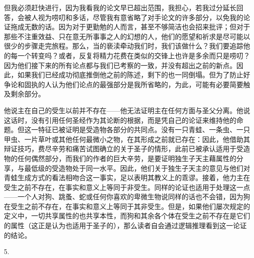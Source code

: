 但我必须赶快进行，因为我看我的论文早已超出范围，我担心，若我过分延长回答，会被人视为唠叨和多话，尽管我有意省略了对手论文的许多部分，以免我的论证拖成无数的话。因为对于更勤勉的人而言，甚至不够简洁也会招来批评；但对于那些不注重效益、只在意无所事事之人的幻想的人，他们的愿望和祈求是尽可能以很少的步骤走完旅程。那么，当的亵渎牵动我们时，我们该做什么？我们要追踪他的每一个转变吗？或者，反复将精力花费在类似的交锋上也许是多余而只是唠叨？因为他们接下来的所有论点都与我们已考察的一致，并没有超出之前的新点。因此，如果我们已经成功彻底推倒他之前的陈述，剩下的也一同倒塌。但为了防止好争论和固执的人认为他们论点的最强部分是我所省略的，为此，可能有必要简要触及剩余部分。\par

他说主在自己的受生以前并不存在——他无法证明主在任何方面与圣父分离。他说这话时，没有引用任何圣经作为其论断的根据，而是凭自己的论证来维持他的命题。但这一特征已被证明是受造物各部分的共同点。没有一只青蛙、一条虫、一只甲虫、一片草叶或其他任何最微小之物，在其形成之前就已存在：因此，他借助其辩证技巧，费尽辛劳和痛苦试图确立的关于圣子的情形，此前已被承认适用于受造物的任何偶然部分，而我们的作者的巨大辛劳，是要证明独生子天主藉属性的分享，与最低级的受造物处于同一水平。因此，他们关于独生子天主的意见与他们对青蛙生成方式的看法相吻合这一事实，足以表明其教义上的乖谬。接着，他力主在受生之前不存在，在事实和意义上等同于非受生。同样的论证也适用于处理这一点——一个人对狗、跳蚤、蛇或任何你喜欢的卑微生物说同样的话也不会错，因为狗在受生之前不存在，在事实和意义上等同于其非受生。但是，如果他们屡次规定的定义中，一切共享属性的也共享本性，而狗和其余各个体在受生之前不存在是它们的属性（这正是认为也适用于圣子的），那么读者自会通过逻辑推理看到这一论证的结论。\par

5. \par

